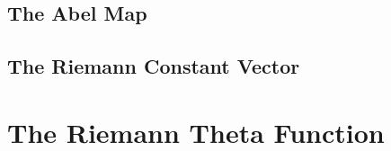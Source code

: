 \subsection{The Abel Map}\label{subsec:background-the-abel-map}

\subsection{The Riemann Constant
  Vector}\label{subsec:background-the-riemann-constant-vector}

\section{The Riemann Theta
  Function}\label{sec:background-riemann-theta-function}
